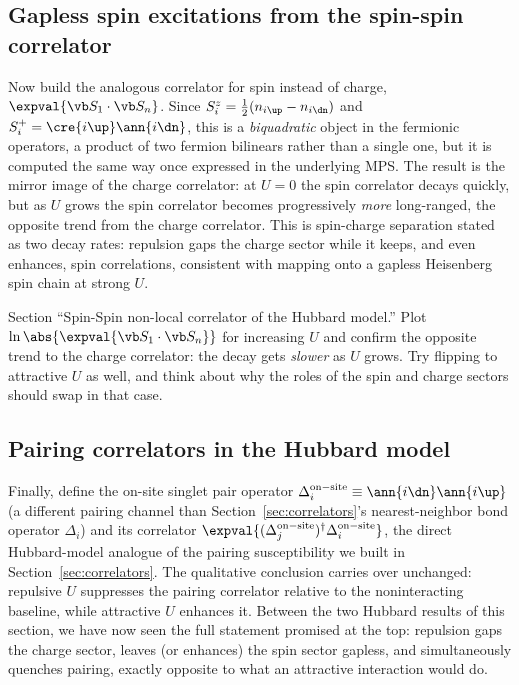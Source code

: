 \documentclass[all_sessions.tex]{subfiles}
\begin{document}
\subsection{Gapless spin excitations from the spin-spin correlator}
Now build the analogous correlator for spin instead of charge, $\expval{\vb S_1\cdot\vb S_n}$. Since
$S_i^z = \tfrac12(n_{i\up}-n_{i\dn})$ and $S_i^+=\cre{i\up}\ann{i\dn}$, this is a \emph{biquadratic}
object in the fermionic operators, a product of two fermion bilinears rather than a single one, but
it is computed the same way once expressed in the underlying MPS. The result is the mirror image of
the charge correlator: at $U=0$ the spin correlator decays quickly, but as $U$ grows the spin
correlator becomes progressively \emph{more} long-ranged, the opposite trend from the charge
correlator. This is spin-charge separation stated as two decay rates: repulsion gaps the charge
sector while it keeps, and even enhances, spin correlations, consistent with mapping onto a gapless
Heisenberg spin chain at strong $U$.

\begin{notebook}
Section ``Spin-Spin non-local correlator of the Hubbard model.'' Plot $\ln\abs{\expval{\vb
S_1\cdot\vb S_n}}$ for increasing $U$ and confirm the opposite trend to the charge correlator: the
decay gets \emph{slower} as $U$ grows. Try flipping to attractive $U$ as well, and think about why
the roles of the spin and charge sectors should swap in that case.
\end{notebook}

\subsection{Pairing correlators in the Hubbard model}
Finally, define the on-site singlet pair operator $\Delta_i^{\mathrm{on-site}} \equiv
\ann{i\dn}\ann{i\up}$ (a different pairing channel than Section~\ref{sec:correlators}'s
nearest-neighbor bond operator $\Delta_i$) and its correlator
$\expval{(\Delta_j^{\mathrm{on-site}})^{\dagger}\Delta_i^{\mathrm{on-site}}}$, the direct
Hubbard-model analogue of the pairing
susceptibility we built in Section~\ref{sec:correlators}. The qualitative conclusion carries over
unchanged: repulsive $U$ suppresses the pairing correlator relative to the noninteracting baseline,
while attractive $U$ enhances it. Between the two Hubbard results of this section, we have now seen
the full statement promised at the top: repulsion gaps the charge sector, leaves (or enhances) the
spin sector gapless, and simultaneously quenches pairing, exactly opposite to what an attractive
interaction would do.
\end{document}
